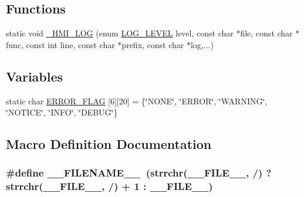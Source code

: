 \subsection*{Functions}
\begin{DoxyCompactItemize}
\item 
static void \hyperlink{src_2hmi-debug_8h_a0846b9d51e2e0612c4825a9a581aa40a}{\+\_\+\+H\+M\+I\+\_\+\+L\+OG} (enum \hyperlink{include_2hmi-debug_8h_aa5a9053636a30269210c54e734e0d583}{L\+O\+G\+\_\+\+L\+E\+V\+EL} level, const char $\ast$file, const char $\ast$func, const int line, const char $\ast$prefix, const char $\ast$log,...)
\end{DoxyCompactItemize}
\subsection*{Variables}
\begin{DoxyCompactItemize}
\item 
static char \hyperlink{src_2hmi-debug_8h_a13d4c7647aad2e84766f8b48a6caab09}{E\+R\+R\+O\+R\+\_\+\+F\+L\+AG} \mbox{[}6\mbox{]}\mbox{[}20\mbox{]} = \{\char`\"{}N\+O\+NE\char`\"{}, \char`\"{}E\+R\+R\+OR\char`\"{}, \char`\"{}W\+A\+R\+N\+I\+NG\char`\"{}, \char`\"{}N\+O\+T\+I\+CE\char`\"{}, \char`\"{}I\+N\+FO\char`\"{}, \char`\"{}D\+E\+B\+UG\char`\"{}\}
\end{DoxyCompactItemize}


\subsection{Macro Definition Documentation}
\subsubsection[{\texorpdfstring{\+\_\+\+\_\+\+F\+I\+L\+E\+N\+A\+M\+E\+\_\+\+\_\+}{__FILENAME__}}]{\setlength{\rightskip}{0pt plus 5cm}\#define \+\_\+\+\_\+\+F\+I\+L\+E\+N\+A\+M\+E\+\_\+\+\_\+~(strrchr(\+\_\+\+\_\+\+F\+I\+L\+E\+\_\+\+\_\+, \textquotesingle{}/\textquotesingle{}) ? strrchr(\+\_\+\+\_\+\+F\+I\+L\+E\+\_\+\+\_\+, \textquotesingle{}/\textquotesingle{}) + 1 \+: \+\_\+\+\_\+\+F\+I\+L\+E\+\_\+\+\_\+)}\hypertarget{src_2hmi-debug_8h_a5fccb4fc71e44089a1b1a77fc76c0b68}{}\label{src_2hmi-debug_8h_a5fccb4fc71e44089a1b1a77fc76c0b68}


